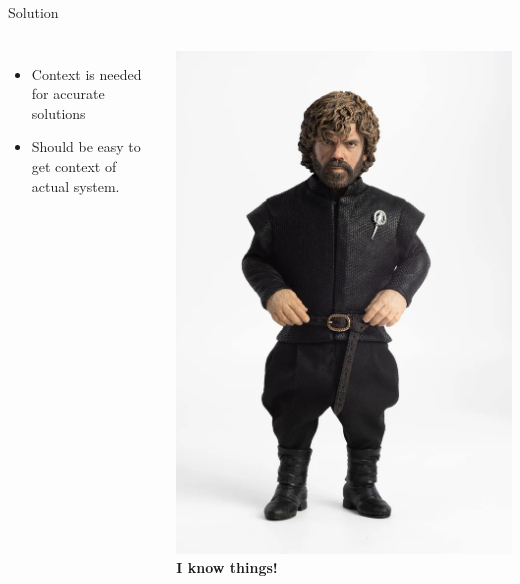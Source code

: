 \documentclass[aspectratio=169]{beamer}
\begin{document}
\begin{frame}[fragile]{Solution}
\begin{columns}
\begin{itemize}
  \item Context is needed for accurate solutions
  \item Should be easy to get context of actual system.
\end{itemize}
  \includegraphics[width=\linewidth]{Tyrion}
\textbf{I know things!}
\end{columns}
\end{frame}
\end{document}
